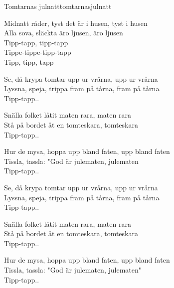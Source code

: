 \begin{song}{Tomtarnas julnatt}{tomtarnasjulnatt}
\begin{vers}
Midnatt råder, tyst det är i husen, tyst i husen\\
Alla sova, släckta äro ljusen, äro ljusen\\
Tipp-tapp, tipp-tapp\\
Tippe-tippe-tipp-tapp\\
Tipp, tipp, tapp\\
\end{vers}
\begin{vers}
Se, då krypa tomtar upp ur vrårna, upp ur vrårna\\
Lyssna, speja, trippa fram på tårna, fram på tårna\\
Tipp-tapp..\\
\end{vers}
\begin{vers}
Snälla folket låtit maten rara, maten rara\\
Stå på bordet åt en tomteskara, tomteskara\\
Tipp-tapp..\\
\end{vers}
\begin{vers}
Hur de mysa, hoppa upp bland faten, upp bland faten\\
Tissla, tassla: "God är julematen, julematen\\
Tipp-tapp..\\
\end{vers}
\begin{vers}
Se, då krypa tomtar upp ur vrårna, upp ur vrårna\\
Lyssna, speja, trippa fram på tårna, fram på tårna\\
Tipp-tapp..\\
\end{vers}
\begin{vers}
Snälla folket låtit maten rara, maten rara\\
Stå på bordet åt en tomteskara, tomteskara\\
Tipp-tapp..\\
\end{vers}
\newp
\begin{vers}
Hur de mysa, hoppa upp bland faten, upp bland faten\\
Tissla, tassla: "God är julematen, julematen"\\
Tipp-tapp..\\
\end{vers}
\begin{vers}

\end{vers}
\end{song}
